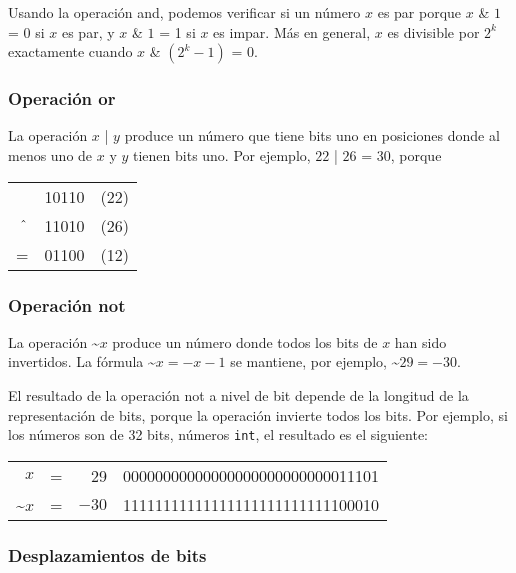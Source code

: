 Usando la operación and, podemos verificar si un número
$x$ es par porque
$x$ \& $1$ = 0 si $x$ es par, y
$x$ \& $1$ = 1 si $x$ es impar.
Más en general, $x$ es divisible por $2^k$
exactamente cuando $x$ \& $(2^k-1)$ = 0.

\subsubsection{Operación or}


La operación  $x$ | $y$ produce un número
que tiene bits uno en posiciones donde al menos uno
de $x$ y $y$ tienen bits uno.
Por ejemplo, $22$ | $26$ = 30, porque


\begin{center}
\begin{tabular}{rrr}
& 10110 & (22)\\
$\XOR$ & 11010 & (26) \\
\hline
 = & 01100 & (12) \\
\end{tabular}
\end{center}

\subsubsection{Operación not}


La operación  \textasciitilde$x$
produce un número donde todos los bits de $x$
han sido invertidos.
La fórmula \textasciitilde$x = -x-1$ se mantiene,
por ejemplo, \textasciitilde$29 = -30$.

El resultado de la operación not a nivel de bit
depende de la longitud de la representación de bits,
porque la operación invierte todos los bits.
Por ejemplo, si los números son de 32 bits,
números \texttt{int}, el resultado es el siguiente:

\begin{center}
\begin{tabular}{rrrr}
$x$ & = & 29 &   00000000000000000000000000011101 \\
\textasciitilde$x$ & = & $-30$ & 11111111111111111111111111100010 \\
\end{tabular}
\end{center}

\subsubsection{Desplazamientos de bits}

